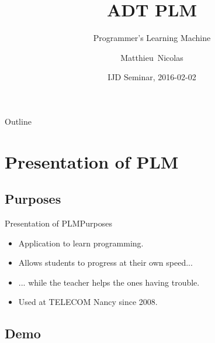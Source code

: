 \documentclass{beamer}
\title{ADT PLM}
\subtitle{Programmer's Learning Machine}
\author{Matthieu~Nicolas}
\date{IJD Seminar, 2016-02-02}
\begin{document}
\begin{frame}
  \titlepage
\end{frame}

\begin{frame}{Outline}
  \tableofcontents
\end{frame}

\section{Presentation of PLM}

\subsection{Purposes}

\begin{frame}{Presentation of PLM}{Purposes}
  \begin{itemize}
  \item {
    Application to learn programming.
    \pause
  }
  \item {
    Allows students to progress at their own speed...
    \pause
  }
  \item {
    ... while the teacher helps the ones having trouble.
    \pause
  }
  \item {
    Used at TELECOM Nancy since 2008.
  }
  \end{itemize}
\end{frame}

\subsection{Demo}
\end{document}
